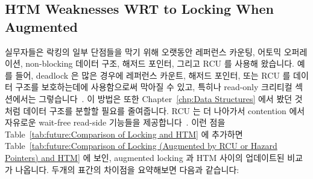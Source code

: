 \subsection{HTM Weaknesses WRT to Locking When Augmented}
\label{sec:future:HTM Weaknesses WRT to Locking When Augmented}



실무자들은 락킹의 일부 단점들을 막기 위해 오랫동안 레퍼런스 카운팅, 어토믹
오퍼레이션, non-blocking 데이터 구조, 해저드 포인터, 그리고 RCU 를 사용해
왔습니다.
예를 들어, deadlock 은 많은 경우에 레퍼런스 카운트, 해저드 포인터, 또는 RCU 를
데이터 구조를 보호하는데에 사용함으로써 막아질 수 있고, 특히나 read-only
크리티컬 섹션에서는
그렇습니다~\cite{MagedMichael04a,HerlihyLM02,MathieuDesnoyers2012URCU,DinakarGuniguntala2008IBMSysJ,ThomasEHart2007a}.
이 방법은 또한
Chapter~\ref{chp:Data Structures} 에서 봤던 것처럼 데이터 구조를 분할할 필요를
줄여줍니다.
RCU 는 더 나아가서 contention 에서 자유로운 wait-free read-side 기능들을
제공합니다~\cite{MathieuDesnoyers2012URCU}.
이런 점을
Table~\ref{tab:future:Comparison of Locking and HTM} 에 추가하면
Table~\ref{tab:future:Comparison of Locking (Augmented by RCU or Hazard Pointers) and HTM}
에 보인, augmented locking 과 HTM 사이의 업데이트된 비교가 나옵니다.
두개의 표간의 차이점을 요약해보면 다음과 같습니다:
\iffalse

Practitioners have long used reference counting, atomic operations,
non-blocking data structures, hazard pointers, and RCU to avoid some
of the shortcomings of locking.
For example, deadlock can be avoided in many cases by using reference
counts, hazard pointers, or RCU to protect data structures,
particularly for read-only critical
sections~\cite{MagedMichael04a,HerlihyLM02,MathieuDesnoyers2012URCU,DinakarGuniguntala2008IBMSysJ,ThomasEHart2007a}.
These approaches also reduce the need to partition data
structures, as was see in Chapter~\ref{chp:Data Structures}.
RCU further provides contention-free wait-free read-side
primitives~\cite{MathieuDesnoyers2012URCU}.
Adding these considerations to
Table~\ref{tab:future:Comparison of Locking and HTM}
results in the updated comparison between augmented locking and HTM
shown in
Table~\ref{tab:future:Comparison of Locking (Augmented by RCU or Hazard Pointers) and HTM}.
A summary of the differences between the two tables is as follows:
\fi


